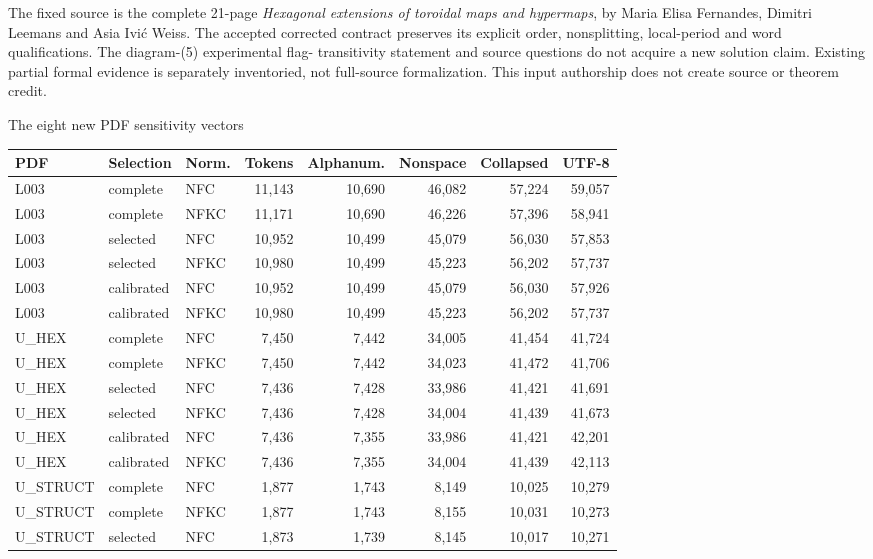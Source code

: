 \documentclass[10pt]{article}
\begin{document}
The fixed source is the complete 21-page \emph{Hexagonal extensions of toroidal
maps and hypermaps}, by Maria Elisa Fernandes, Dimitri Leemans and Asia Ivi\'c
Weiss. The accepted corrected contract preserves its explicit order, nonsplitting,
local-period and word qualifications. The diagram-(5) experimental flag-
transitivity statement and source questions do not acquire a new solution claim.
Existing partial formal evidence is separately inventoried, not full-source
formalization. This input authorship does not create source or theorem credit.
\newpage
\begin{center}{\large The eight new PDF sensitivity vectors}\end{center}
\begin{center}\scriptsize\setlength{\tabcolsep}{3.2pt}\renewcommand{\arraystretch}{1.04}
\begin{tabular}{lllrrrrr}\toprule
PDF & Selection & Norm. & Tokens & Alphanum. & Nonspace & Collapsed & UTF-8\\\midrule
L003 & complete & NFC & 11,143 & 10,690 & 46,082 & 57,224 & 59,057\\
L003 & complete & NFKC & 11,171 & 10,690 & 46,226 & 57,396 & 58,941\\
L003 & selected & NFC & 10,952 & 10,499 & 45,079 & 56,030 & 57,853\\
L003 & selected & NFKC & 10,980 & 10,499 & 45,223 & 56,202 & 57,737\\
L003 & calibrated & NFC & 10,952 & 10,499 & 45,079 & 56,030 & 57,926\\
L003 & calibrated & NFKC & 10,980 & 10,499 & 45,223 & 56,202 & 57,737\\
U\_HEX & complete & NFC & 7,450 & 7,442 & 34,005 & 41,454 & 41,724\\
U\_HEX & complete & NFKC & 7,450 & 7,442 & 34,023 & 41,472 & 41,706\\
U\_HEX & selected & NFC & 7,436 & 7,428 & 33,986 & 41,421 & 41,691\\
U\_HEX & selected & NFKC & 7,436 & 7,428 & 34,004 & 41,439 & 41,673\\
U\_HEX & calibrated & NFC & 7,436 & 7,355 & 33,986 & 41,421 & 42,201\\
U\_HEX & calibrated & NFKC & 7,436 & 7,355 & 34,004 & 41,439 & 42,113\\
U\_STRUCT & complete & NFC & 1,877 & 1,743 & 8,149 & 10,025 & 10,279\\
U\_STRUCT & complete & NFKC & 1,877 & 1,743 & 8,155 & 10,031 & 10,273\\
U\_STRUCT & selected & NFC & 1,873 & 1,739 & 8,145 & 10,017 & 10,271\\

\end{tabular}
\end{center}
\end{document}
